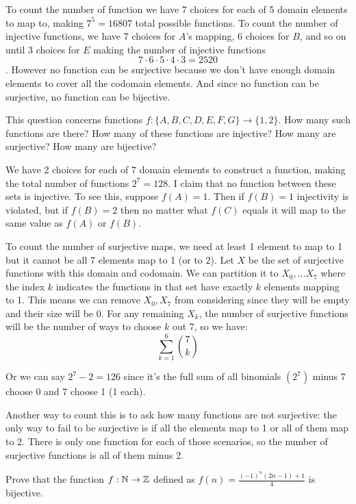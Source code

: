\documentclass{article}
\begin{document}
To count the number of function we have 7 choices for each of 5 domain elements to map to, making $7^5 = 16807$ total possible functions. To count the number of injective functions, we have 7 choices for $A$'s mapping, 6 choices for $B$, and so on until 3 choices for $E$ making the number of injective functions
$$7\cdot6\cdot5\cdot4\cdot3 = 2520$$. However no function can be surjective because we don't have enough domain elements to cover all the codomain elements. And since no function can be surjective, no function can be bijective.

\begin{problem}
This question concerns functions $f: \{A, B, C, D, E, F, G\} \to \{1, 2\}$. How many such functions are there? How many of these functions are injective? How many are surjective? How many are bijective?
\end{problem}

We have 2 choices for each of 7 domain elements to construct a function, making the total number of functions $2^7 = 128$. I claim that no function between these sets is injective. To see this, suppose $f(A) = 1$. Then if $f(B) = 1$ injectivity is violated, but if $f(B) = 2$ then no matter what $f(C)$ equals it will map to the same value as $f(A)$ or $f(B)$.

To count the number of surjective maps, we need at least 1 element to map to 1 but it cannot be all 7 elements map to 1 (or to 2). Let $X$ be the set of surjective functions with this domain and codomain. We can partition it to $X_0, \ldots X_7$ where the index $k$ indicates the functions in that set have exactly $k$ elements mapping to 1. This means we can remove $X_0, X_7$ from considering since they will be empty and their size will be 0. For any remaining $X_k$, the number of surjective functions will be the number of ways to choose $k$ out 7, so we have:
$$\sum_{k=1}^6 \binom{7}{k}$$

Or we can say $2^7 - 2 = 126$ since it's the full sum of all binomials $(2^7)$ minus 7 choose 0 and 7 choose 1 (1 each).

Another way to count this is to ask how many functions are not surjective: the only way to fail to be surjective is if all the elements map to 1 or all of them map to 2. There is only one function for each of those scenarios, so the number of surjective functions is all of them minus 2.

\begin{problem}
Prove that the function $f: \mathbb{N} \to \mathbb{Z}$ defined as $f(n) = \frac{(-1)^n (2n - 1) + 1}{4}$ is bijective.
\end{problem}
\end{document}
